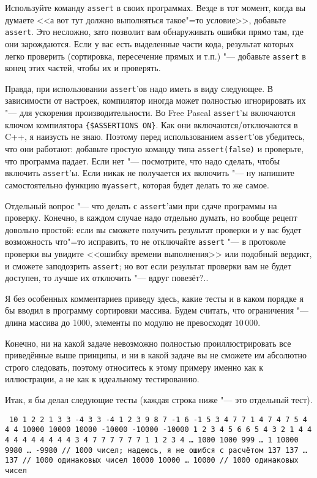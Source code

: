 Используйте команду \verb`assert` в своих программах. 
Везде в тот момент, когда вы думаете <<а вот тут должно выполняться такое"=то условие>>, добавьте \verb`assert`. 
Это несложно, зато позволит вам обнаруживать ошибки прямо там, где они зарождаются. 
Если у вас есть выделенные части кода, результат которых легко проверить (сортировка, пересечение прямых и т.п.) "---
добавьте \verb`assert` в конец этих частей, чтобы их и проверять.

Правда, при использовании \verb`assert`'ов надо иметь в виду следующее.
В зависимости от настроек, компилятор иногда может полностью игнорировать их "--- для ускорения производительности.
Во Free Pascal \verb`assert`'ы включаются ключом компилятора \verb`{$ASSERTIONS ON}`. 
Как они включаются/отключаются в C++, я наизусть не знаю.
Поэтому перед использованием \verb`assert`'ов убедитесь, что они работают: добавьте простую команду типа \verb`assert(false)` и проверьте,
что программа падает. 
Если нет "--- посмотрите, что надо сделать, чтобы включить \verb`assert`'ы. 
Если никак не получается их включить "--- ну напишите самостоятельно функцию \verb`myassert`, которая будет делать то же самое.

Отдельный вопрос "--- что делать с \verb`assert`'ами при сдаче программы на проверку. 
Конечно, в каждом случае надо отдельно думать, но вообще рецепт довольно простой: если вы сможете получить результат проверки и у вас будет возможность
что"=то исправить, то не отключайте \verb`assert` "--- в протоколе проверки вы увидите <<ошибку времени выполнения>> или подобный вердикт, и
сможете заподозрить \verb`assert`; но вот если результат проверки вам не будет доступен, то лучше их отключить "--- вдруг повезёт?..

Я без особенных комментариев приведу здесь, какие тесты и в каком порядке я бы вводил в программу сортировки массива. 
Будем считать, что ограничения "--- длина массива до 1000, элементы по модулю не превосходят $10\,000$.

Конечно, ни на какой задаче невозможно полностью проиллюстрировать все приведённые выше принципы, и ни в какой задаче вы не сможете 
им абсолютно строго следовать, поэтому относитесь к этому примеру именно как к иллюстрации, а не как к идеальному тестированию.

Итак, я бы делал следующие тесты (каждая строка ниже "--- это отдельный тест).

{\noindent\tt{}
10
1 2
2 1
3 3
-4 3
3 -4
1 2 3
9 8 7
-1 6 -1
5 3 4
7 7 1
4 7 4 7
5 4 4 4
10000 10000 10000 -10000 -10000 -10000
1 2 3 4 5 6
6 5 4 3 2 1
4 4 4 4 4 4
4 4 4 4 3 4
7 7 7 7 7 7 1
1 2 3 4 \dots{} 1000
1000 999 \dots{} 1
10000 9980 \dots{} -9980 // 1000 чисел; надеюсь, я не ошибся с расчётом
137 137 \dots{} 137 // 1000 одинаковых чисел
10000 10000 \dots{} 10000 // 1000 одинаковых чисел 
}

